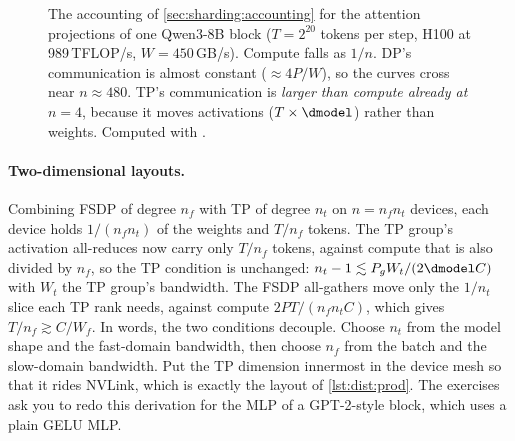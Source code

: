 \begin{figure}[t]
\centering
{}
\caption{The accounting of \cref{sec:sharding:accounting} for the attention projections of one
Qwen3-8B block ($T=2^{20}$ tokens per step, H100 at 989\,TFLOP/s, $W=450$\,GB/s). Compute falls
as $1/n$. DP's communication is almost constant ($\approx4P/W$), so the curves cross near
$n\approx480$. TP's communication is \emph{larger than compute already at $n=4$}, because it moves
activations ($T\times\dmodel$) rather than weights. Computed with .}
\label{fig:sharding:accounting}
\end{figure}

\paragraph{Two-dimensional layouts.} Combining FSDP of degree $n_f$ with TP of degree $n_t$ on
$n = n_f n_t$ devices, each device holds $1/(n_f n_t)$ of the weights and $T/n_f$ tokens. The TP
group's activation all-reduces now carry only $T/n_f$ tokens, against compute that is also divided
by $n_f$, so the TP condition is unchanged: $n_t - 1\lesssim P_g W_t/(2\dmodel C)$ with $W_t$ the
TP group's bandwidth. The FSDP all-gathers move only the $1/n_t$ slice each TP rank needs, against
compute $2PT/(n_f n_t C)$, which gives $T/n_f \gtrsim C/W_f$. In words, the two conditions decouple. Choose
$n_t$ from the model shape and the fast-domain bandwidth, then choose $n_f$ from the batch and the
slow-domain bandwidth. Put the TP dimension innermost in the device mesh so that it rides NVLink,
which is exactly the layout of \cref{lst:dist:prod}. The exercises ask you to redo this
derivation for the MLP of a GPT-2-style block, which uses a plain GELU MLP.

